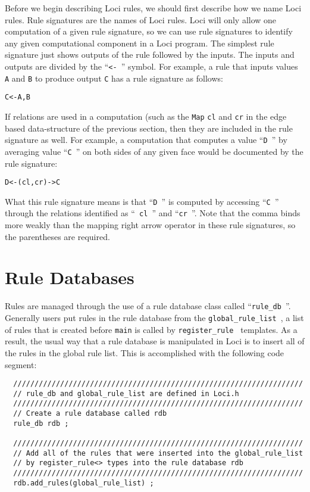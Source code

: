 \documentclass[10pt,epsf]{book}
\begin{document}
Before we begin describing Loci rules, we should first describe how we
name Loci rules.  Rule signatures are the names of Loci rules.  Loci
will only allow one computation of a given rule signature, so we can
use rule signatures to identify any given computational component in a
Loci program.  The simplest rule signature just shows outputs of the
rule followed by the inputs.  The inputs and outputs are divided by
the ``{\tt <- }'' symbol.  For example, a rule that inputs values {\tt
  A} and {\tt B} to produce output {\tt C} has a rule signature as
follows:

\begin{verbatim}
C<-A,B
\end{verbatim}

If relations are used in a computation (such as the {\tt Map} {\tt cl}
and {\tt cr} in the edge based data-structure of the previous section,
then they are included in the rule signature as well.  For example, a
computation that computes a value ``{\tt D }'' by averaging value
``{\tt C }'' on both sides of any given face would be documented by
the rule signature:

\begin{verbatim}
D<-(cl,cr)->C
\end{verbatim}

What this rule signature means is that ``{\tt D }'' is computed by
accessing ``{\tt C }'' through the relations identified as ``{\tt
  cl }'' and ``{\tt cr }''.  Note that the comma binds more weakly than
the mapping right arrow operator in these rule signatures, so the
parentheses are required.

\section{Rule Databases}

Rules are managed through the use of a rule database class called
``{\tt rule\_db }''.  Generally users put rules in the rule database
from the {\tt global\_rule\_list }, a list of rules that is created
before {\tt main} is called by {\tt register\_rule } templates.  As a
result, the usual way that a rule database is manipulated in Loci is
to insert all of the rules in the global rule list.  This is
accomplished with the following code segment: 

\begin{verbatim}
  ////////////////////////////////////////////////////////////////////
  // rule_db and global_rule_list are defined in Loci.h
  ////////////////////////////////////////////////////////////////////
  // Create a rule database called rdb
  rule_db rdb ;

  ////////////////////////////////////////////////////////////////////
  // Add all of the rules that were inserted into the global_rule_list
  // by register_rule<> types into the rule database rdb
  ////////////////////////////////////////////////////////////////////
  rdb.add_rules(global_rule_list) ;
\end{verbatim}
\end{document}
